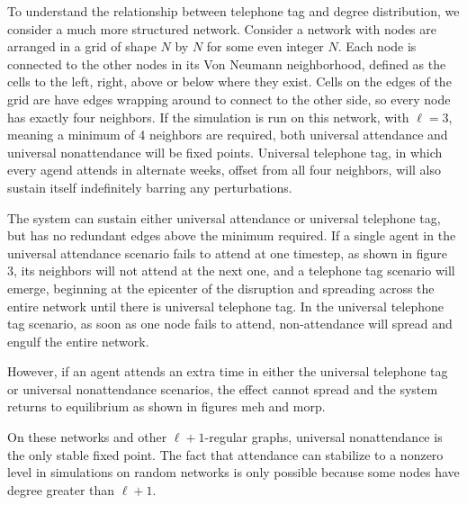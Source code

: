 \documentclass[12pt]{article}
\begin{document}
To understand the relationship between telephone tag and degree distribution, we consider a much more structured network.  Consider a network with nodes are arranged in a grid of shape $N$ by $N$ for some even integer $N$.  Each node is connected to the other nodes in its Von Neumann neighborhood, defined as the cells to the left, right, above or below where they exist.  Cells on the edges of the grid are have edges wrapping around to connect to the other side, so every node has exactly four neighbors.  If the simulation is run on this network, with $\ell = 3$, meaning a minimum of 4 neighbors are required, both universal attendance and universal nonattendance will be fixed points.  Universal telephone tag, in which every agend attends in alternate weeks, offset from all four neighbors, will also sustain itself indefinitely barring any perturbations.

The system can sustain either universal attendance or universal telephone tag, but has no redundant edges above the minimum required.  If a single agent in the universal attendance scenario fails to attend at one timestep, as shown in figure 3, its neighbors will not attend at the next one, and a telephone tag scenario will emerge, beginning at the epicenter of the disruption and spreading across the entire network until there is universal telephone tag.  In the universal telephone tag scenario, as soon as one node fails to attend, non-attendance will spread and engulf the entire network.

However, if an agent attends an extra time in either the universal telephone tag or universal nonattendance scenarios, the effect cannot spread and the system returns to equilibrium as shown in figures meh and morp.

On these networks and other $\ell + 1$-regular graphs, universal nonattendance is the only stable fixed point.  The fact that attendance can stabilize to a nonzero level in simulations on random networks is only possible because some nodes have degree greater than $\ell + 1$.
\end{document}
